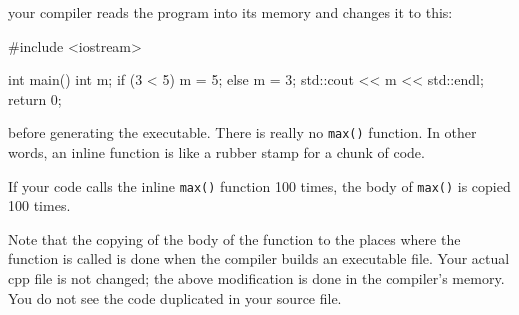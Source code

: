 your compiler reads the program into its memory and changes it to this:

\begin{consolethree}[escapeinside=||]
#include <iostream>

int main()
{
    int m;
    if (3 < 5) m = 5;
    else m = 3;
    std::cout << m << std::endl;
    return 0;
}
\end{consolethree}

before generating the executable. There is really no \texttt{max()} function. In other words, an inline function is like a rubber stamp for a chunk of code.

If your code calls the inline \texttt{max()} function 100 times, the body of \texttt{max()} is copied 100 times.

Note that the copying of the body of the function to the places where the function is called is done when the compiler builds an executable file. Your actual cpp file is not changed; the above modification is done in the compiler's memory. You do not see the code duplicated in your source file.



